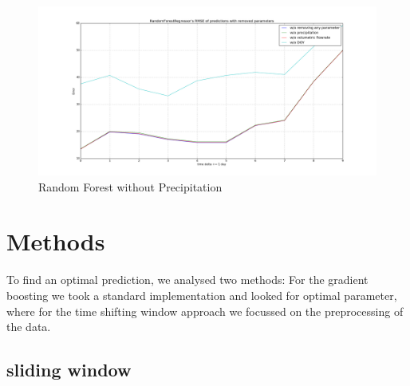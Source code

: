 \documentclass{scrartcl}
\begin{document}
\begin{figure}[H]
  \center
  \includegraphics[width=1\linewidth]{img/RandomForestRegressor_day_error_without_precipation.png}
  \caption{Random Forest without Precipitation}
  \label{fig:RandomForestRegressor_day_error_without_precipation}
\end{figure}

\section{Methods}
\label{sec:methods}
To find an optimal prediction, we analysed two methods: For the gradient boosting we took a standard implementation and looked for optimal parameter, where for the time shifting window approach we focussed on the preprocessing of the data.

\subsection{sliding window}
\end{document}
